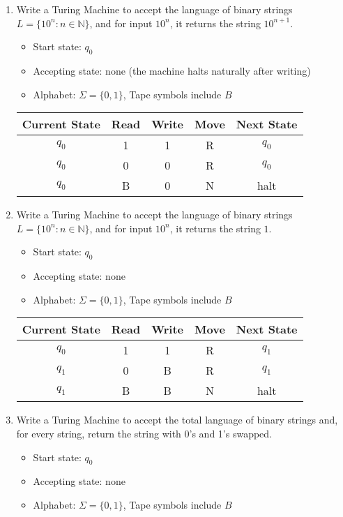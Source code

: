 \documentclass{article}
\theoremstyle{theorem}
\theoremstyle{definition}
\theoremstyle{remark}
\begin{document}
\begin{enumerate}
\item Write a Turing Machine to accept the language of binary strings \( L = \{10^n : n \in \mathbb{N} \} \), and for input \( 10^n \), it returns the string \( 10^{n+1} \).
\begin{itemize}
  \item Start state: \( q_0 \)
  \item Accepting state: none (the machine halts naturally after writing)
  \item Alphabet: \( \Sigma = \{0,1\} \), Tape symbols include \( B \)
\end{itemize}

\begin{center}
\begin{tabular}{|c|c|c|c|c|}
\hline
Current State & Read & Write & Move & Next State \\
\hline
$q_0$ & 1 & 1 & R & $q_0$ \\
$q_0$ & 0 & 0 & R & $q_0$ \\
$q_0$ & B & 0 & N & halt \\
\hline
\end{tabular}
\end{center}

\item Write a Turing Machine to accept the language of binary strings \( L = \{10^n : n \in \mathbb{N} \} \), and for input \( 10^n \), it returns the string \( 1 \).
\begin{itemize}
  \item Start state: \( q_0 \)
  \item Accepting state: none
  \item Alphabet: \( \Sigma = \{0,1\} \), Tape symbols include \( B \)
\end{itemize}

\begin{center}
\begin{tabular}{|c|c|c|c|c|}
\hline
Current State & Read & Write & Move & Next State \\
\hline
$q_0$ & 1 & 1 & R & $q_1$ \\
$q_1$ & 0 & B & R & $q_1$ \\
$q_1$ & B & B & N & halt \\
\hline
\end{tabular}
\end{center}

\item Write a Turing Machine to accept the total language of binary strings and, for every string, return the string with 0's and 1's swapped.
\begin{itemize}
  \item Start state: \( q_0 \)
  \item Accepting state: none
  \item Alphabet: \( \Sigma = \{0,1\} \), Tape symbols include \( B \)
\end{itemize}


\end{enumerate}
\end{document}
